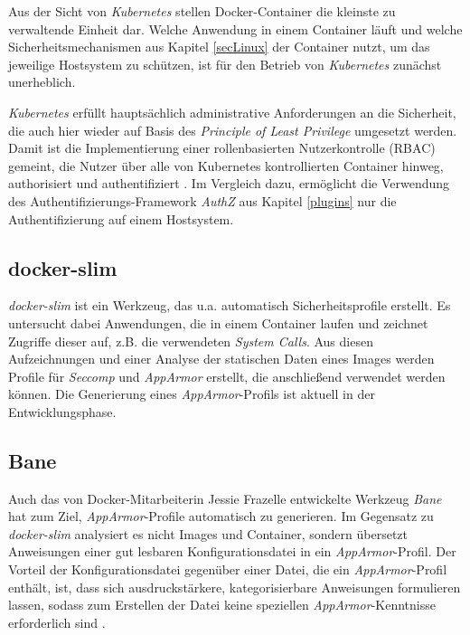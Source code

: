 \documentclass[../main.tex]{subfiles}
\begin{document}
      Aus der Sicht von \emph{Kubernetes} stellen Docker-Container die kleinste zu verwaltende Einheit dar. Welche Anwendung in einem Container läuft und welche Sicherheitsmechanismen aus Kapitel \ref{secLinux} der Container nutzt, um das jeweilige Hostsystem zu schützen, ist für den Betrieb von \emph{Kubernetes} zunächst unerheblich.

      \emph{Kubernetes} erfüllt hauptsächlich administrative Anforderungen an die Sicherheit, die auch hier wieder auf Basis des \emph{Principle of Least Privilege} umgesetzt werden. Damit ist die Implementierung einer rollenbasierten Nutzerkontrolle (\acrshort{RBAC}) gemeint, die Nutzer über alle von Kubernetes kontrollierten Container hinweg, authorisiert und authentifiziert \cite{githubKubernetesSecurity}. Im Vergleich dazu, ermöglicht die Verwendung des Authentifizierungs-Framework \emph{AuthZ} aus Kapitel \ref{plugins} nur die Authentifizierung auf einem Hostsystem.



    \subsection{docker-slim}
      \emph{docker-slim} ist ein Werkzeug, das u.a. automatisch Sicherheitsprofile erstellt. Es untersucht dabei Anwendungen, die in einem Container laufen und zeichnet Zugriffe dieser auf, z.B. die verwendeten \emph{System Calls}. Aus diesen Aufzeichnungen und einer Analyse der statischen Daten eines Images werden Profile für \emph{Seccomp} und \emph{AppArmor} erstellt, die anschließend verwendet werden können. Die Generierung eines \emph{AppArmor}-Profils ist aktuell in der Entwicklungsphase.

    \subsection{Bane}
      Auch das von Docker-Mitarbeiterin Jessie Frazelle entwickelte Werkzeug \emph{Bane} hat zum Ziel, \emph{AppArmor}-Profile automatisch zu generieren. Im Gegensatz zu \emph{docker-slim} analysiert es nicht Images und Container, sondern übersetzt Anweisungen einer gut lesbaren Konfigurationsdatei in ein \emph{AppArmor}-Profil. Der Vorteil der Konfigurationsdatei gegenüber einer Datei, die ein \emph{AppArmor}-Profil enthält, ist, dass sich ausdruckstärkere, kategorisierbare Anweisungen formulieren lassen, sodass zum Erstellen der Datei keine speziellen \emph{AppArmor}-Kenntnisse erforderlich sind \cite{githubBane}.
\end{document}
